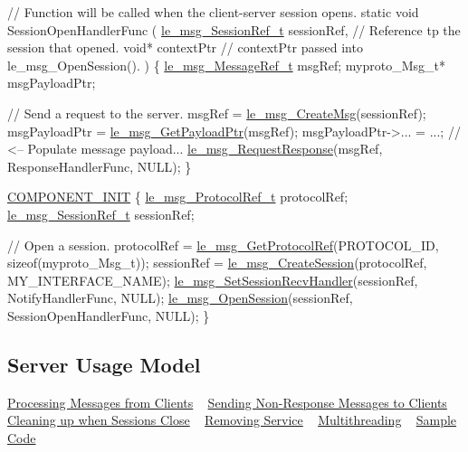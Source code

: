 \begin{DoxyCode}
\textcolor{comment}{// Function will be called when the client-server session opens.}
\textcolor{keyword}{static} \textcolor{keywordtype}{void} SessionOpenHandlerFunc
(
    \hyperlink{le__messaging_8h_aebfc01e15b430a5b4f3038a5bd518904}{le\_msg\_SessionRef\_t}  sessionRef, \textcolor{comment}{// Reference tp the session that opened.}
    \textcolor{keywordtype}{void}*                contextPtr  \textcolor{comment}{// contextPtr passed into le\_msg\_OpenSession().}
)
\{
    \hyperlink{le__messaging_8h_a1e5c37fdd50a4d6d24cad82cb166f770}{le\_msg\_MessageRef\_t} msgRef;
    myproto\_Msg\_t* msgPayloadPtr;

    \textcolor{comment}{// Send a request to the server.}
    msgRef = \hyperlink{le__messaging_8h_a8293a69f256b98cbce5b9990ea3520f3}{le\_msg\_CreateMsg}(sessionRef);
    msgPayloadPtr = \hyperlink{le__messaging_8h_a32d1c7ffd913db8546f6f1bd5cce58c4}{le\_msg\_GetPayloadPtr}(msgRef);
    msgPayloadPtr->... = ...; \textcolor{comment}{// <-- Populate message payload...}
    \hyperlink{le__messaging_8h_a5440ae06a89b60ed04e9de5601496608}{le\_msg\_RequestResponse}(msgRef, ResponseHandlerFunc, NULL);
\}

\hyperlink{le__event_loop_8h_abdb9187a56836a93d19cc793cbd4b7ec}{COMPONENT\_INIT}
\{
    \hyperlink{le__messaging_8h_ac05e9b3268f8fb5776adab6fe11410e5}{le\_msg\_ProtocolRef\_t} protocolRef;
    \hyperlink{le__messaging_8h_aebfc01e15b430a5b4f3038a5bd518904}{le\_msg\_SessionRef\_t} sessionRef;

    \textcolor{comment}{// Open a session.}
    protocolRef = \hyperlink{le__messaging_8h_adcd1ff1a6906433aaa6d7038125c4473}{le\_msg\_GetProtocolRef}(PROTOCOL\_ID, \textcolor{keyword}{sizeof}(myproto\_Msg\_t));
    sessionRef = \hyperlink{le__messaging_8h_a696d7c2d4e3725d3ddb5dd2d79d2d732}{le\_msg\_CreateSession}(protocolRef, MY\_INTERFACE\_NAME);
    \hyperlink{le__messaging_8h_ac726cc93219d326e1b10a7d13a0f4f65}{le\_msg\_SetSessionRecvHandler}(sessionRef, NotifyHandlerFunc, NULL);
    \hyperlink{le__messaging_8h_a574d37960a07c4fc2bde310408619cff}{le\_msg\_OpenSession}(sessionRef, SessionOpenHandlerFunc, NULL);
\}
\end{DoxyCode}
\hypertarget{c_messaging_c_messagingServerUsage}{}\subsection{Server Usage Model}\label{c_messaging_c_messagingServerUsage}
\hyperlink{c_messaging_c_messagingServerProcessingMessages}{Processing Messages from Clients} ~\newline
 \hyperlink{c_messaging_c_messagingServerSendingNonResponse}{Sending Non-\/\+Response Messages to Clients} ~\newline
 \hyperlink{c_messaging_c_messagingServerCleanUp}{Cleaning up when Sessions Close} ~\newline
 \hyperlink{c_messaging_c_messagingRemovingService}{Removing Service} ~\newline
 \hyperlink{c_messaging_c_messagingServerMultithreading}{Multithreading} ~\newline
 \hyperlink{c_messaging_c_messagingServerExample}{Sample Code}

